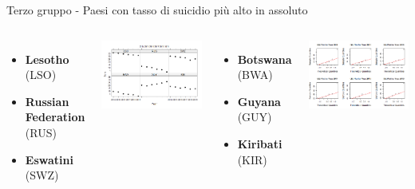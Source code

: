 \documentclass{beamer}
\begin{document}
\begin{frame}{Terzo gruppo - Paesi con tasso di suicidio più alto in assoluto}
	\begin{columns}
			\begin{itemize}
				\item \textbf{Lesotho} (LSO)
				\item \textbf{Russian Federation} (RUS)
				\item \textbf{Eswatini} (SWZ)
			\end{itemize}
			\bigskip
			\includegraphics[width=\linewidth]{Images/9 - Thirdgroup.png}
			\begin{itemize}
				\item \textbf{Botswana} (BWA)
				\item \textbf{Guyana} (GUY)
				\item \textbf{Kiribati} (KIR)
			\end{itemize}
			\bigskip
			\includegraphics[width=\linewidth]{Images/10 - Thirdqq.png}
	\end{columns}
\end{frame}
\end{document}

